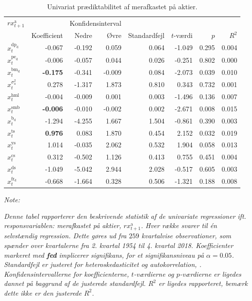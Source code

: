\documentclass[
  a4paper,
  oneside]{memoir}
\begin{document}
\begin{table}[!h]

\caption{\label{tab:UNI-ak}Univariat prædiktabilitet af merafkastet på aktier.}
\centering
\begin{threeparttable}
\begin{tabular}[t]{lrrrrrrr}
\toprule
\multicolumn{1}{c}{$rx_{t+1}^{\text{a}}$} & \multicolumn{1}{c}{ } & \multicolumn{2}{c}{Konfidensinterval} & \multicolumn{4}{c}{ } \\
\cmidrule(l{3pt}r{3pt}){1-1} \cmidrule(l{3pt}r{3pt}){3-4}
  & Koefficient & Nedre & Øvre & Standardfejl & $t$-værdi & $p$ & $R^2$\\
\midrule
\rowcolor{gray!6}  $x_t^{\text{dp}_{\text{d}}}$ & -0.067 & -0.192 & 0.059 & 0.064 & -1.049 & 0.295 & 0.004\\
$x_t^{\text{pe}_{\text{d}}}$ & -0.006 & -0.057 & 0.044 & 0.026 & -0.251 & 0.802 & 0.000\\
\rowcolor{gray!6}  $x_t^{\text{bm}_{\text{d}}}$ & \textbf{-0.175} & -0.341 & -0.009 & 0.084 & -2.073 & 0.039 & 0.010\\
$x_t^{\sigma_{\text{a}}^2}$ & 0.278 & -1.317 & 1.873 & 0.810 & 0.343 & 0.732 & 0.001\\
\rowcolor{gray!6}  $x_t^{\text{hml}}$ & -0.004 & -0.009 & 0.001 & 0.003 & -1.496 & 0.136 & 0.007\\
$x_t^{\text{smb}}$ & \textbf{-0.006} & -0.010 & -0.002 & 0.002 & -2.671 & 0.008 & 0.015\\
\rowcolor{gray!6}  $x_t^{\text{b}_{\text{d}}}$ & -1.294 & -4.255 & 1.667 & 1.504 & -0.861 & 0.390 & 0.003\\
$x_t^{\text{ts}}$ & \textbf{ 0.976} & 0.083 & 1.870 & 0.454 & 2.152 & 0.032 & 0.019\\
\rowcolor{gray!6}  $x_t^{\text{ys}}$ & 1.014 & -0.035 & 2.062 & 0.532 & 1.904 & 0.058 & 0.013\\
$x_t^{\text{cs}}$ & 0.312 & -0.502 & 1.126 & 0.413 & 0.755 & 0.451 & 0.004\\
\rowcolor{gray!6}  $x_t^{\text{ds}}$ & -1.049 & -5.042 & 2.944 & 2.028 & -0.517 & 0.605 & 0.003\\
$x_t^{\text{fr}_{\text{d}}}$ & -0.668 & -1.664 & 0.328 & 0.506 & -1.321 & 0.188 & 0.008\\
\bottomrule
\end{tabular}
\begin{tablenotes}
\item \textit{Note: } 
\item \textit{Denne tabel rapporterer den beskrivende statistik af de univariate regressioner ift. responsvariablen: merafkastet på aktier, $rx_{t+1}^{\text{a}}$. Hver række svarer til én selvstændig regression. Dette gøres ud fra $259$ kvartalvise observationer, som spænder over kvartalerne fra 2. kvartal 1954 til 4. kvartal 2018. Koefficienter markeret med \textbf{fed} implicerer signifikans, for et signifikansniveau på $\alpha=0.05$. Standardfejl er justeret for heteroskedasticitet og autokorrelation, \citep{Newey1987}. Konfidensintervallerne for koefficienterne, $t$-værdierne og $p$-værdierne er ligedes dannet på baggrund af de justerede standardfejl. $R^2$ er ligedes rapporteret, bemærk dette ikke er den justerede $R^2$.}

\end{tablenotes}
\end{threeparttable}
\end{table}
\end{document}
